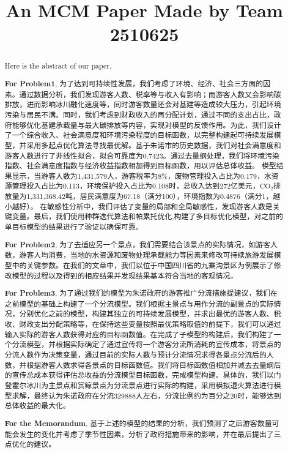 \documentclass[12pt]{article}  %
\title{An MCM Paper Made by Team 2510625}  %
\begin{document}
\begin{abstract}
    Here is the abstract of our paper.

    \textbf{For Problem1}, 为了达到可持续性发展，我们考虑了环境、经济、社会三方面的因素。通过数据分析，我们发现游客人数、税率等与收入有影响；而游客人数又会影响碳排放，进而影响冰川融化速度等，同时游客数量还会对基建等造成较大压力，引起环境污染与居民不满。同时，我们考虑到财政收入的再分配计划，通过不同的支出占比，政府能够优化基建承载量与最大碳排放等内容，实现对模型的反馈作用。为此，我们设计了一个综合收入、社会满意度和环境污染程度的目标函数，以完整构建起可持续发展模型，并采用多起点优化算法寻找最优解。基于朱诺市的历史数据，我们对社会满意度和游客人数进行了非线性拟合，拟合可靠度为0.7423。通过去量纲处理，我们将环境污染指数、社会满意度指数与经济收益指数相加得到目标函数，用以评估总体收益。
	模型结果显示，当游客人数为1,431,579人，游客税率为8\%，废物管理投入占比为0.179，水资源管理投入占比为0.113，环境保护投入占比为0.108时，总收入达到272亿美元，$\text{CO}_2$排放量为1,331,368.42吨，居民满意度为67.18（满分100），环境指数为0.4876（满分1，越小越好）。
	在敏感性分析中，我们评估了变量的局部和全局敏感性，发现游客人数是关键变量。最后，我们使用种群迭代算法和帕累托优化,构建了多目标优化模型，对之前的单目标模型的结果进行了验证以确保可靠。

    \textbf{For Problem2}, 为了去适应另一个景点，我们需要结合该景点的实际情况，如游客人数，游客人均消费，当地的水资源和废物处理承载能力等因素来修改可持续旅游发展模型中的关键参数。在我们的文章中，我们以位于中国四川省的九寨沟景区为例展示了修改模型的过程以及得到的相应结果并发现结果基本符合当地的客观情况。

    \textbf{For Problem3}, 为了通过我们的模型为朱诺政府的游客推广分流措施提建议，我们在之前模型的基础上构建了一个分流模型。我们根据主景点与用作分流的副景点的实际情况，分别优化之前的模型，构建其独立的可持续发展模型，并求出最优的游客人数、税收、财政支出分配策略等，在保持这些变量按照最优策略取值的前提下，我们可以通过输入实际的游客人数获得对应的目标函数值。在完成了子模型的构建后，我们构建了一个分流模型，并根据实际确定了通过宣传将一个游客分流所消耗的宣传成本，将景点的分流人数作为决策变量，通过目前的实际人数与预计分流情况求得各景点分流后的人数，并根据游客人数求得各景点的目标函数值。我们将目标函数值相加并减去去量纲后的宣传总成本获得评估总收益的分流模型目标函数，完成模型构建。具体的，我们以门登霍尔冰川为主景点和赏鲸景点为分流景点进行实际的构建，采用模拟退火算法进行模型求解，最终认为朱诺政府在分流329888人左右，分流比例约为百分之20时，能够达到总体收益的最大化。

	\textbf{For the Memorandum}, 基于上述的模型的结果的分析，我们预测了之后游客数量可能会发生的变化并考虑了季节性因素，分析了政府措施带来的影响，并在最后提出了三点优化的建议。

\end{abstract}
\end{document}
